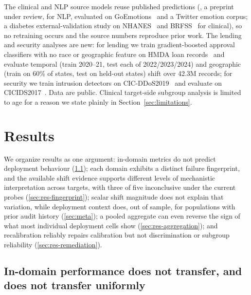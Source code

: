 \documentclass[11pt]{article}
\begin{document}
The clinical and NLP source models reuse published predictions
(\citealp{pall2026cpfe}, a preprint under review, for NLP, evaluated on GoEmotions~\citep{demszky2020goemotions} and a
Twitter emotion corpus; a diabetes external-validation study on NHANES~\citep{nhanes} and
BRFSS~\citep{brfss} for clinical), so no retraining occurs and the source numbers reproduce prior
work. The lending and security analyses are new: for lending we train gradient-boosted approval
classifiers with no race or geographic feature on HMDA loan records~\citep{hmda} and evaluate
temporal (train 2020--21, test each of 2022/2023/2024) and geographic (train on 60\% of states,
test on held-out states) shift over 42.3M records; for security we train intrusion detectors on
CIC-DDoS2019~\citep{sharafaldin2019ddos2019} and evaluate on
CICIDS2017~\citep{sharafaldin2018ids2017}. Data are public. Clinical target-side subgroup analysis
is limited to age for a reason we state plainly in Section~\ref{sec:limitations}.

\section{Results}\label{sec:results}

We organize results as one argument: in-domain metrics do not predict deployment behaviour
(\ref{sec:res-indomain}); each domain exhibits a distinct failure fingerprint, and the available
shift evidence supports different levels of mechanistic interpretation across targets, with three
of five inconclusive under the current probes (\ref{sec:res-fingerprint}); scalar shift magnitude
does not explain that variation, while deployment context does, out of sample, for populations with
prior audit history (\ref{sec:meta}); a pooled aggregate can even reverse the sign of what most
individual deployment cells show (\ref{sec:res-aggregation}); and recalibration reliably repairs
calibration but not discrimination or subgroup reliability (\ref{sec:res-remediation}).

\subsection{In-domain performance does not transfer, and does not transfer uniformly}
\label{sec:res-indomain}
\end{document}

